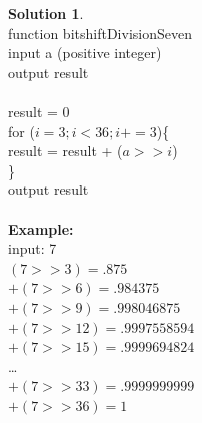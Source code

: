 \documentclass{article}
\theoremstyle{definition}
\newtheorem*{solution}{Solution}
\begin{document}
\begin{solution}\ \\
function bitshiftDivisionSeven\ \\
input a (positive integer)\ \\
output result\ \\
\ \\
result = 0 \ \\

for ($i=3 ; i<36 ; i+=3$)\{\ \\
\indent \indent     result = result + ($a >> i$) \ \\
\indent \}\ \\

output result
\ \\
\ \\

\noindent \textbf{Example:}\ \\
input: 7\ \\
$(7>>3) = .875$\ \\
$+(7>>6) = .984375$\ \\
$+(7>>9) = .998046875$\ \\
$+(7>>12) = .9997558594$\ \\
$+(7>>15) = .9999694824$\ \\
\dots\ \\
$+(7>>33) =.9999999999$\ \\
$+(7>>36) = 1$\ \\
\end{solution}
\end{document}
